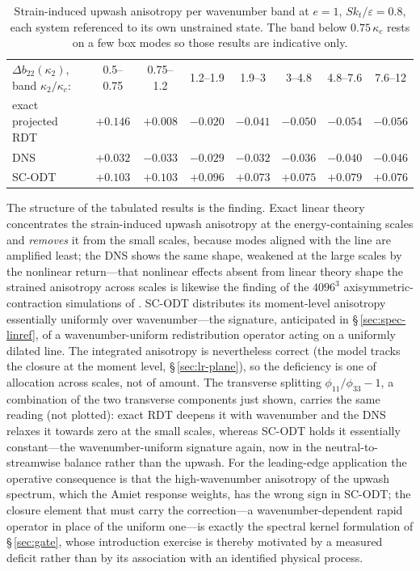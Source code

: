 \documentclass[lineno]{JFM-FLM_Au}
\begin{document}
\begin{table}
  \centering\small
  \begin{tabular}{lccccccc}
  $\Delta b_{22}(\kappa_2)$, band $\kappa_2/\kappa_c$: & 0.5--0.75 & 0.75--1.2 & 1.2--1.9 & 1.9--3 & 3--4.8 & 4.8--7.6 & 7.6--12\\[2pt]
  exact projected RDT & $+0.146$ & $+0.008$ & $-0.020$ & $-0.041$ & $-0.050$ & $-0.054$ & $-0.056$\\
  DNS                 & $+0.032$ & $-0.033$ & $-0.029$ & $-0.032$ & $-0.036$ & $-0.040$ & $-0.046$\\
  SC-ODT              & $+0.103$ & $+0.103$ & $+0.096$ & $+0.073$ & $+0.075$ & $+0.079$ & $+0.076$\\
  \end{tabular}
  \caption{Strain-induced upwash anisotropy per wavenumber band at $e=1$,
  $Sk_t/\varepsilon=0.8$, each system referenced to its own unstrained
  state. The band below $0.75\,\kappa_c$ rests on a few box modes so those results are
  indicative only.}
  \label{tab:threeway}
\end{table}

The structure of the tabulated results is the finding. Exact linear theory concentrates
the strain-induced upwash anisotropy at the energy-containing scales and
\emph{removes} it from the small scales, because modes aligned with the
line are amplified least; the DNS shows the same shape, weakened at the
large scales by the nonlinear return---that nonlinear effects absent from
linear theory shape the strained anisotropy across scales is likewise the
finding of the $4096^3$ axisymmetric-contraction simulations of
\citet{ClayYeung2016}. SC-ODT distributes
its moment-level anisotropy essentially uniformly over wavenumber---the
signature, anticipated in \S\,\ref{sec:spec-linref}, of a
wavenumber-uniform redistribution operator acting on a uniformly dilated
line. The integrated anisotropy is nevertheless correct (the model tracks
the closure at the moment level, \S\,\ref{sec:lr-plane}), so the deficiency
is one of allocation across scales, not of amount. The transverse
splitting $\phi_{11}/\phi_{33}-1$, a combination of the two transverse
components just shown, carries the same reading (not plotted): exact RDT
deepens it with wavenumber and the DNS relaxes it towards zero at the
small scales, whereas SC-ODT holds it essentially constant---the
wavenumber-uniform signature again, now in the neutral-to-streamwise
balance rather than the upwash. For the leading-edge
application the operative consequence is that the high-wavenumber
anisotropy of the upwash spectrum, which the Amiet response weights, has
the wrong sign in SC-ODT; the closure element that must carry
the correction---a wavenumber-dependent rapid operator in place of the
uniform one---is exactly the spectral kernel formulation of
\S\,\ref{sec:gate}, whose introduction exercise is thereby motivated by a measured
deficit rather than by its association with an identified physical process.
\end{document}

